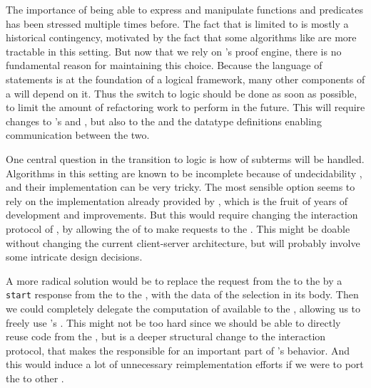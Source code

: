 The importance of being able to express and manipulate 
functions and predicates has been stressed multiple times before. The fact that
 is limited to  is mostly a historical
contingency, motivated by the fact that some algorithms like 
are more tractable in this setting. But now that we rely on 's proof
engine, there is no fundamental reason for maintaining this choice. Because the
language of statements is at the foundation of a logical framework, many other
components of a  will depend on it. Thus the switch to
 logic should be done as soon as possible, to limit the amount
of refactoring work to perform in the future. This will require changes to
's  and , but also to the 
 and the 
datatype definitions enabling communication between the two.

One central question in the transition to  logic is how
 of subterms will be handled. Algorithms in this setting are
known to be incomplete because of undecidability
, and their implementation can be very
tricky. The most sensible option seems to rely on the implementation already
provided by , which is the fruit of years of development and
improvements. But this would require changing the interaction protocol of
, by allowing the  of  to make
 requests to the . This might be doable without
changing the current client-server architecture, but will probably involve some
intricate design decisions.

A more radical solution would be to replace the  request from
the  to the  by a \texttt{start} response
from the  to the , with the data of the
selection in its body. Then we could completely delegate the computation of
available  to the , allowing us to freely use 's
. This might not be too hard since we should be able to directly
reuse  code from the , but is a deeper structural change
to the interaction protocol, that makes the  responsible for an
important part of 's behavior. And this would induce a lot of
unnecessary reimplementation efforts if we were to port the  to
other .

